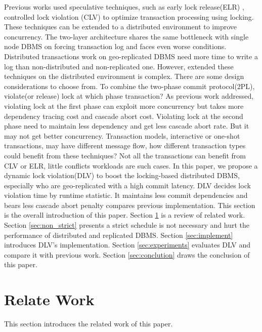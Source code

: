 \documentclass[conference]{IEEEtran}
\begin{document}
Previous works used speculative techniques, such as early lock release(ELR) \cite{EfficientLocking:conf/vldb/KimuraGK12}, controlled lock violation (CLV)\cite{CLV:conf/sigmod/GraefeLKTV13} to optimize transaction processing using locking.
These techniques can be extended to a distributed environment to improve concurrency.
The two-layer architecture shares the same bottleneck with single node DBMS on forcing transaction log and faces even worse conditions.
Distributed transactions work on geo-replicated DBMS need more time to write a log than non-distributed and non-replicated one.
However, extended these techniques on the distributed environment is complex.
There are some design considerations to choose from.
To combine the two-phase commit protocol(2PL), violate(or release) lock at which phase transaction?
As previous work addressed\cite{CLV:conf/sigmod/GraefeLKTV13}, violating lock at the first phase can exploit more concurrency but takes more dependency tracing cost and cascade abort cost.
Violating lock at the second phase need to maintain less dependency and get less cascade abort rate.
But it may not get better concurrency.
Transaction models, interactive or one-shot transactions, may have different message flow, how different transaction types could benefit from these techniques?
Not all the transactions can benefit from CLV or ELR, little conflicts workloads are such cases.
In this paper, we propose a dynamic lock violation(DLV) to boost the locking-based distributed DBMS, especially who are geo-replicated with a high commit latency.
DLV decides lock violation time by runtime statistic.
It maintains less commit dependencies and bears less cascade abort penalty compares previous implementation\cite{CLV:conf/sigmod/GraefeLKTV13}. 
This section is the overall introduction of this paper.
Section \ref{sec:relate_work} is a review of related work.
Section \ref{sec:non_strict} presents a strict schedule is not necessary and hurt the performance of distributed and replicated DBMS.
Section \ref{sec:implement} introduces DLV's implementation.
Section \ref{sec:experiments} evaluates DLV and compare it with previous work.
Section \ref{sec:conclution} draws the conclusion of this paper.


\section{Relate Work}
\label{sec:relate_work}
This section introduces the related work of this paper.
\end{document}
